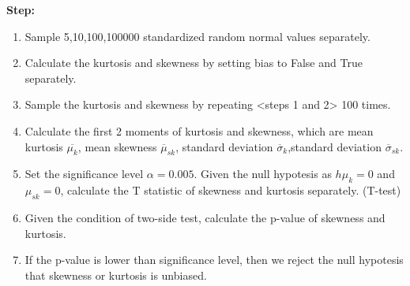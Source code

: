 \documentclass[11pt,en]{elegantpaper}
\begin{document}
\textbf{Step:}
\begin{enumerate}[leftmargin = 70pt]
    \item Sample 5,10,100,100000 standardized random normal values separately.
    \item Calculate the kurtosis and skewness by setting bias to False and True separately.
    \item Sample the kurtosis and skewness by repeating <steps 1 and 2> 100 times.
    \item Calculate the first 2 moments of kurtosis and skewness, which are mean kurtosis  $\overline{\mu_k}$, 
    mean skewness $\overline \mu_{sk}$, standard deviation $\overline \sigma_k$,standard deviation $\overline \sigma_{sk}$.
    \item Set the significance level $\alpha=0.005$. Given the null hypotesis as $h\mu_k=0$ 
    and $\mu_{sk}=0$, calculate the T statistic of skewness and kurtosis separately. (T-test)
    \item Given the condition of two-side test, calculate the p-value of skewness and kurtosis.
    \item If the p-value is lower than significance level, then we reject the null hypotesis that skewness or kurtosis is unbiased.
\end{enumerate}
\end{document}
